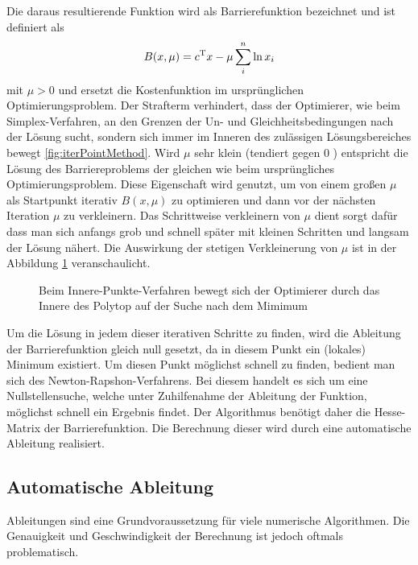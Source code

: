 \documentclass{like}
\begin{document}
Die daraus resultierende Funktion wird als Barrierefunktion bezeichnet und ist definiert als \\
\begin{equation}
	B(x,\mu) =  c\textsuperscript{T}x - \mu \sum_{i}^{n} \ln x_i
\end{equation}
mit $\mu > 0$ und ersetzt die Kostenfunktion im ursprünglichen Optimierungsproblem. Der Strafterm verhindert, dass der Optimierer, wie beim Simplex-Verfahren, an den Grenzen der Un- und Gleichheitsbedingungen nach der Lösung sucht, sondern sich immer im Inneren des zulässigen Lösungsbereiches bewegt \ref{fig:iterPointMethod}.
Wird \(\mu\) sehr klein (tendiert gegen \(0\) ) entspricht die Lösung des Barriereproblems der gleichen wie beim ursprüngliches Optimierungsproblem. Diese Eigenschaft wird genutzt, um von einem großen \(\mu\) als Startpunkt iterativ $B(x,\mu)$ zu optimieren und dann vor der nächsten Iteration \(\mu\) zu verkleinern. Das Schrittweise verkleinern von $\mu$ dient sorgt dafür dass man sich anfangs grob und schnell später mit kleinen Schritten und langsam der Lösung nähert. Die Auswirkung der stetigen Verkleinerung von \(\mu\) ist in der Abbildung \ref{fig:iterPointLn} veranschaulicht.

\begin{figure}[ht!]
	\centering
	 
	\caption{Beim Innere-Punkte-Verfahren bewegt sich der Optimierer durch das Innere des Polytop auf der Suche nach dem Mimimum}
	\label{fig:iterPointLn}
\end{figure}

Um die Lösung in jedem dieser iterativen Schritte zu finden, wird die Ableitung der Barrierefunktion gleich null gesetzt, da in diesem Punkt ein (lokales) Minimum existiert. Um diesen Punkt möglichst schnell zu finden, bedient man sich des Newton-Rapshon-Verfahrens. Bei diesem handelt es sich um eine Nullstellensuche, welche unter Zuhilfenahme der Ableitung der Funktion, möglichst schnell ein Ergebnis findet. Der Algorithmus benötigt daher die Hesse-Matrix der Barrierefunktion. Die Berechnung dieser wird durch eine automatische Ableitung realisiert.

\subsection{Automatische Ableitung} 

Ableitungen sind eine Grundvoraussetzung für viele numerische Algorithmen. Die Genauigkeit und Geschwindigkeit der Berechnung ist jedoch oftmals problematisch.
\end{document}
